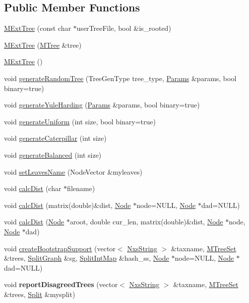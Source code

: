 \subsection*{Public Member Functions}
\begin{DoxyCompactItemize}
\item 
\hyperlink{classMExtTree_a98519878a9ba52ed6a8b6672666407af}{MExtTree} (const char $\ast$userTreeFile, bool \&is\_\-rooted)
\item 
\hyperlink{classMExtTree_a7a4160a0b7fccfa64ad1e26ceba7774b}{MExtTree} (\hyperlink{classMTree}{MTree} \&tree)
\item 
\hyperlink{classMExtTree_abbad38db501392d69db9544b7f796054}{MExtTree} ()
\item 
void \hyperlink{classMExtTree_aa709714f825099a4128ff8eb0fc3c419}{generateRandomTree} (TreeGenType tree\_\-type, \hyperlink{structParams}{Params} \&params, bool binary=true)
\item 
void \hyperlink{classMExtTree_a9e048ce7a85817ff65dabe6a739ab1d0}{generateYuleHarding} (\hyperlink{structParams}{Params} \&params, bool binary=true)
\item 
void \hyperlink{classMExtTree_a9fa7114ba07c9ae332235e5e2a5baf2b}{generateUniform} (int size, bool binary=true)
\item 
void \hyperlink{classMExtTree_aedaa4579940f46a5a4becde25856d8b4}{generateCaterpillar} (int size)
\item 
void \hyperlink{classMExtTree_aace82df578f02396df24b7dde3ae81bc}{generateBalanced} (int size)
\item 
void \hyperlink{classMExtTree_a690a4da143b341b8969c9d176a221984}{setLeavesName} (NodeVector \&myleaves)
\item 
void \hyperlink{classMExtTree_ab89f62be12aaaf2b63ddbef4e8750b38}{calcDist} (char $\ast$filename)
\item 
void \hyperlink{classMExtTree_a283c7b86a9755f4cc4ec0c9fa7787a48}{calcDist} (matrix(double)\&dist, \hyperlink{classNode}{Node} $\ast$node=NULL, \hyperlink{classNode}{Node} $\ast$dad=NULL)
\item 
void \hyperlink{classMExtTree_a0519ce518addd2ada2794e16436491f3}{calcDist} (\hyperlink{classNode}{Node} $\ast$aroot, double cur\_\-len, matrix(double)\&dist, \hyperlink{classNode}{Node} $\ast$node, \hyperlink{classNode}{Node} $\ast$dad)
\item 
void \hyperlink{classMExtTree_ae1336390c977f7de6153ca2b06e9fbe1}{createBootstrapSupport} (vector$<$ \hyperlink{classNxsString}{NxsString} $>$ \&taxname, \hyperlink{classMTreeSet}{MTreeSet} \&trees, \hyperlink{classSplitGraph}{SplitGraph} \&sg, \hyperlink{classSplitIntMap}{SplitIntMap} \&hash\_\-ss, \hyperlink{classNode}{Node} $\ast$node=NULL, \hyperlink{classNode}{Node} $\ast$dad=NULL)
\item 
\hypertarget{classMExtTree_af47064686e191078090afb640d02fec1}{
void {\bfseries reportDisagreedTrees} (vector$<$ \hyperlink{classNxsString}{NxsString} $>$ \&taxname, \hyperlink{classMTreeSet}{MTreeSet} \&trees, \hyperlink{classSplit}{Split} \&mysplit)}
\label{classMExtTree_af47064686e191078090afb640d02fec1}


\end{DoxyCompactItemize}
